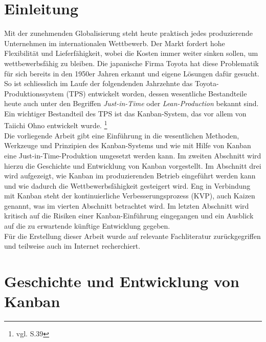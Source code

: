 \section{Einleitung}
Mit der zunehmenden Globalisierung steht heute praktisch jedes produzierende Unternehmen 
im internationalen Wettbewerb. Der Markt fordert hohe Flexibilität und Lieferfähigkeit, 
wobei die Kosten immer weiter sinken sollen, um wettbewerbsfähig zu bleiben.
Die japanische Firma Toyota hat diese Problematik für sich bereits in den 1950er
Jahren erkannt und eigene Lösungen dafür gesucht. So ist schliesslich im Laufe der
folgendenden Jahrzehnte das Toyota-Produktionssystem (TPS) entwickelt worden, dessen 
wesentliche Bestandteile heute auch unter den Begriffen  \emph{Just-in-Time} oder  
 \emph{Lean-Production} bekannt sind. Ein wichtiger Bestandteil des TPS ist das
Kanban-System, das vor allem von Taiichi Ohno entwickelt wurde.
\footnote{vgl. \cite{Ohno2013TPS} S.39}\\
Die vorliegende Arbeit gibt eine Einführung in die wesentlichen Methoden, 
Werkzeuge und Prinzipien des Kanban-Systems und wie mit Hilfe von Kanban eine
Just-in-Time-Produktion umgesetzt werden kann. Im zweiten Abschnitt wird hierzu
die Geschichte und Entwicklung von Kanban vorgestellt.
Im Abschnitt drei wird aufgezeigt, wie Kanban im produzierenden Betrieb 
eingeführt werden kann und wie dadurch die Wettbewerbsfähigkeit gesteigert wird. 
Eng in Verbindung mit Kanban steht der kontinuierliche Verbesserungsprozess 
(KVP), auch Kaizen genannt, was im vierten Abschnitt betrachtet wird.
Im letzten Abschnitt wird kritisch auf die Risiken einer Kanban-Einführung
eingegangen und ein Ausblick auf die zu erwartende künftige Entwicklung gegeben.\\
Für die Erstellung dieser Arbeit wurde auf relevante Fachliteratur zurückgegriffen
und teilweise auch im Internet recherchiert.

\section{Geschichte und Entwicklung von Kanban}


